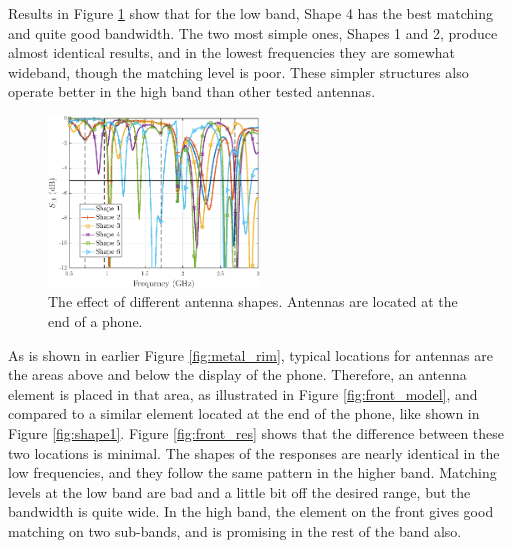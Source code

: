 Results in Figure \ref{fig:shape} show that for the low band, Shape 4 has the best matching and quite good bandwidth. The two most simple ones, Shapes 1 and 2, produce almost identical results, and in the lowest frequencies they are somewhat wideband, though the matching level is poor. These simpler structures also operate better in the high band than other tested antennas.

\begin{figure}[H]
    \centering
    \includegraphics[width=0.5\textwidth]{img/shape.eps}
    \caption{The effect of different antenna shapes. Antennas are located at the end of a phone.}
    \label{fig:shape}
    \vspace{-12pt}
\end{figure}

As is shown in earlier Figure \ref{fig:metal_rim}, typical locations for antennas are the areas above and below the display of the phone. Therefore, an antenna element is placed in that area, as illustrated in Figure \ref{fig:front_model}, and compared to a similar element located at the end of the phone, like shown in Figure \ref{fig:shape1}. Figure \ref{fig:front_res} shows that the difference between these two locations is minimal. The shapes of the responses are nearly identical in the low frequencies, and they follow the same pattern in the higher band. Matching levels at the low band are bad and a little bit off the desired range, but the bandwidth is quite wide. In the high band, the element on the front gives good matching on two sub-bands, and is promising in the rest of the band also.

